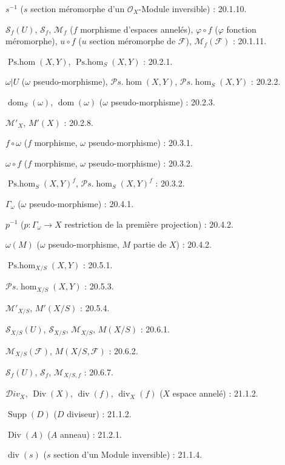 $s^{-1}$ ($s$ section méromorphe d'un $\mathcal O_X$-Module inversible) : 20.1.10.

$\mathcal S_f(U)$, $\mathcal S_f$, $\mathcal M_f$
($f$ morphisme d'espaces annelés), $\varphi\circ f$ ($\varphi$ fonction méromorphe),
$u\circ f$ ($u$ section méromorphe de $\mathcal F$), $\mathcal M_f(\mathcal F)$ : 20.1.11.

$\operatorname{Ps.hom}(X,Y)$, $\operatorname{Ps.hom}_S(X,Y)$ : 20.2.1.

$\omega|U$ ($\omega$ pseudo-morphisme),
$\mathcal P\!s.\operatorname{hom}(X,Y)$,
$\mathcal P\!s.\operatorname{hom}_S(X,Y)$ : 20.2.2.

$\operatorname{dom}_S(\omega)$, $\operatorname{dom}(\omega)$
($\omega$ pseudo-morphisme) : 20.2.3.

$\mathcal M'_X$, $M'(X)$ : 20.2.8.

$f\circ\omega$ ($f$ morphisme, $\omega$ pseudo-morphisme) : 20.3.1.

$\omega\circ f$ ($f$ morphisme, $\omega$ pseudo-morphisme) : 20.3.2.

$\operatorname{Ps.hom}_S(X,Y)^f$,
$\mathcal P\!s.\operatorname{hom}_S(X,Y)^f$ : 20.3.2.

$\Gamma_\omega$ ($\omega$ pseudo-morphisme) : 20.4.1.

$p^{-1}$ ($p:\Gamma_\omega\to X$ restriction de la première projection) : 20.4.2.

$\omega(M)$ ($\omega$ pseudo-morphisme, $M$ partie de $X$) : 20.4.2.

$\operatorname{Ps.hom}_{X/S}(X,Y)$ : 20.5.1.

$\mathcal P\!s.\operatorname{hom}_{X/S}(X,Y)$ : 20.5.3.

$\mathcal M'_{X/S}$, $M'(X/S)$ : 20.5.4.

$\mathcal S_{X/S}(U)$, $\mathcal S_{X/S}$, $\mathcal M_{X/S}$,
$M(X/S)$ : 20.6.1.

$\mathcal M_{X/S}(\mathcal F)$, $M(X/S,\mathcal F)$ : 20.6.2.

$\mathcal S_f(U)$, $\mathcal S_f$, $\mathcal M_{X/S,f}$ : 20.6.7.

$\mathcal{D}iv_X$, $\operatorname{Div}(X)$, $\operatorname{div}(f)$,
$\operatorname{div}_X(f)$ ($X$ espace annelé) : 21.1.2.

$\operatorname{Supp}(D)$ ($D$ diviseur) : 21.1.2.

$\operatorname{Div}(A)$ ($A$ anneau) : 21.2.1.

$\operatorname{div}(s)$ ($s$ section d'un Module inversible) : 21.1.4.

